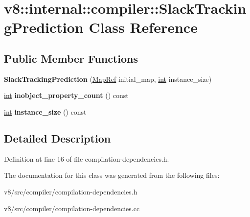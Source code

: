\hypertarget{classv8_1_1internal_1_1compiler_1_1SlackTrackingPrediction}{}\section{v8\+:\+:internal\+:\+:compiler\+:\+:Slack\+Tracking\+Prediction Class Reference}
\label{classv8_1_1internal_1_1compiler_1_1SlackTrackingPrediction}
\subsection*{Public Member Functions}
\begin{DoxyCompactItemize}
\item 
\mbox{\label{classv8_1_1internal_1_1compiler_1_1SlackTrackingPrediction_ac38d1aa9da465dbb698370b4f0e047cb}} 
{\bfseries Slack\+Tracking\+Prediction} (\mbox{\hyperlink{classv8_1_1internal_1_1compiler_1_1MapRef}{Map\+Ref}} initial\+\_\+map, \mbox{\hyperlink{classint}{int}} instance\+\_\+size)
\item 
\mbox{\label{classv8_1_1internal_1_1compiler_1_1SlackTrackingPrediction_aa73993dd579dd6d19b4de059102b7ab6}} 
\mbox{\hyperlink{classint}{int}} {\bfseries inobject\+\_\+property\+\_\+count} () const
\item 
\mbox{\label{classv8_1_1internal_1_1compiler_1_1SlackTrackingPrediction_abcbad03769f45d8b793db1ac96e52ac0}} 
\mbox{\hyperlink{classint}{int}} {\bfseries instance\+\_\+size} () const
\end{DoxyCompactItemize}


\subsection{Detailed Description}


Definition at line 16 of file compilation-\/dependencies.\+h.



The documentation for this class was generated from the following files\+:\begin{DoxyCompactItemize}
\item 
v8/src/compiler/compilation-\/dependencies.\+h\item 
v8/src/compiler/compilation-\/dependencies.\+cc\end{DoxyCompactItemize}
